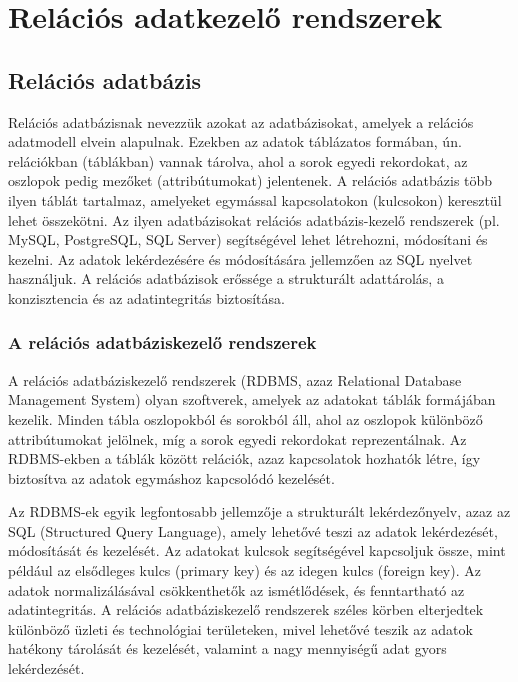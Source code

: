 \documentclass[colorlinks]{thesis-kando}
\theoremstyle{definition}
\theoremstyle{remark}
\begin{document}
\chapter{Relációs adatkezelő rendszerek}

\section{Relációs adatbázis}

Relációs adatbázisnak nevezzük azokat az adatbázisokat, amelyek a relációs adatmodell elvein alapulnak. Ezekben az adatok táblázatos formában, ún. relációkban (táblákban) vannak tárolva, ahol a sorok egyedi rekordokat, az oszlopok pedig mezőket (attribútumokat) jelentenek. A relációs adatbázis több ilyen táblát tartalmaz, amelyeket egymással kapcsolatokon (kulcsokon) keresztül lehet összekötni. Az ilyen adatbázisokat relációs adatbázis-kezelő rendszerek (pl. MySQL, PostgreSQL, SQL Server) segítségével lehet létrehozni, módosítani és kezelni. Az adatok lekérdezésére és módosítására jellemzően az SQL nyelvet használjuk. A relációs adatbázisok erőssége a strukturált adattárolás, a konzisztencia és az adatintegritás biztosítása.

\subsection{A relációs adatbáziskezelő rendszerek}

A relációs adatbáziskezelő rendszerek (RDBMS, azaz Relational Database Management System) olyan szoftverek, amelyek az adatokat táblák formájában kezelik. Minden tábla oszlopokból és sorokból áll, ahol az oszlopok különböző attribútumokat jelölnek, míg a sorok egyedi rekordokat reprezentálnak. Az RDBMS-ekben a táblák között relációk, azaz kapcsolatok hozhatók létre, így biztosítva az adatok egymáshoz kapcsolódó kezelését.

Az RDBMS-ek egyik legfontosabb jellemzője a strukturált lekérdezőnyelv, azaz az SQL (Structured Query Language), amely lehetővé teszi az adatok lekérdezését, módosítását és kezelését. Az adatokat kulcsok segítségével kapcsoljuk össze, mint például az elsődleges kulcs (primary key) és az idegen kulcs (foreign key). Az adatok normalizálásával csökkenthetők az ismétlődések, és fenntartható az adatintegritás. A relációs adatbáziskezelő rendszerek széles körben elterjedtek különböző üzleti és technológiai területeken, mivel lehetővé teszik az adatok hatékony tárolását és kezelését, valamint a nagy mennyiségű adat gyors lekérdezését.
\pagebreak
\end{document}

